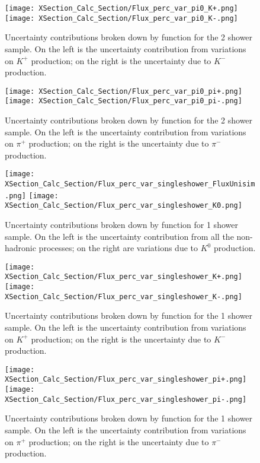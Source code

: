 \begin{figure}[h!]
\centering
\texttt{[image: XSection\_Calc\_Section/Flux\_perc\_var\_pi0\_K+.png]}
\texttt{[image: XSection\_Calc\_Section/Flux\_perc\_var\_pi0\_K-.png]}
\caption{ Uncertainty contributions broken down by function for the 2 shower sample. On the left is the uncertainty contribution from variations on $K^+$ production; on the right is the uncertainty due to $K^-$ production. }
\label{fig:flux_2shower_unc_plots_1}
\end{figure}

\begin{figure}[h!]
\centering
\texttt{[image: XSection\_Calc\_Section/Flux\_perc\_var\_pi0\_pi+.png]}
\texttt{[image: XSection\_Calc\_Section/Flux\_perc\_var\_pi0\_pi-.png]}
\caption{ Uncertainty contributions broken down by function for the 2 shower sample. On the left is the uncertainty contribution from variations on $\pi^+$ production; on the right is the uncertainty due to $\pi^-$ production. }
\label{fig:flux_2shower_unc_plots_2}
\end{figure}


\begin{figure}[h!]
\centering
\texttt{[image: XSection\_Calc\_Section/Flux\_perc\_var\_singleshower\_FluxUnisim.png]}
\texttt{[image: XSection\_Calc\_Section/Flux\_perc\_var\_singleshower\_K0.png]}
\caption{ Uncertainty contributions broken down by function for 1 shower sample. On the left is the uncertainty contribution from all the non-hadronic processes; on the right are variations due to $K^0$ production. }
\label{fig:flux_1shower_unc_plots_0}
\end{figure}

\begin{figure}[h!]
\centering
\texttt{[image: XSection\_Calc\_Section/Flux\_perc\_var\_singleshower\_K+.png]}
\texttt{[image: XSection\_Calc\_Section/Flux\_perc\_var\_singleshower\_K-.png]}
\caption{ Uncertainty contributions broken down by function for the 1 shower sample. On the left is the uncertainty contribution from variations on $K^+$ production; on the right is the uncertainty due to $K^-$ production. }
\label{fig:flux_1shower_unc_plots_1}
\end{figure}

\begin{figure}[h!]
\centering
\texttt{[image: XSection\_Calc\_Section/Flux\_perc\_var\_singleshower\_pi+.png]}
\texttt{[image: XSection\_Calc\_Section/Flux\_perc\_var\_singleshower\_pi-.png]}
\caption{ Uncertainty contributions broken down by function for the 1 shower sample. On the left is the uncertainty contribution from variations on $\pi^+$ production; on the right is the uncertainty due to $\pi^-$ production. }
\label{fig:flux_1shower_unc_plots_2}
\end{figure}

